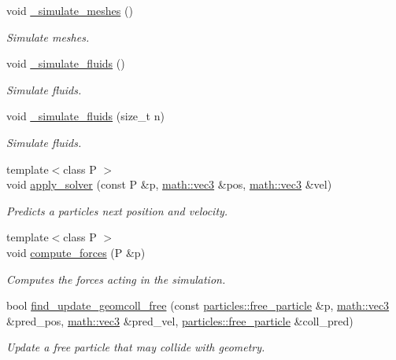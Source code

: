 \begin{DoxyCompactItemize}
void \hyperlink{classphysim_1_1simulator_ac598aa9b36e01c8cee937a8f95719cd8}{\+\_\+simulate\+\_\+meshes} ()
\begin{DoxyCompactList}\small\item\em Simulate meshes. \end{DoxyCompactList}\item 
void \hyperlink{classphysim_1_1simulator_ac01677745377a9520453b73e199fcf99}{\+\_\+simulate\+\_\+fluids} ()
\begin{DoxyCompactList}\small\item\em Simulate fluids. \end{DoxyCompactList}\item 
void \hyperlink{classphysim_1_1simulator_a5b0b7e9c7790144f17d5de13c8d098dc}{\+\_\+simulate\+\_\+fluids} (size\+\_\+t n)
\begin{DoxyCompactList}\small\item\em Simulate fluids. \end{DoxyCompactList}\item 
{\footnotesize template$<$class P $>$ }\\void \hyperlink{classphysim_1_1simulator_a551890b383f97f13bb429e40f72c6c33}{apply\+\_\+solver} (const P \&p, \hyperlink{structphysim_1_1math_1_1vec3}{math\+::vec3} \&pos, \hyperlink{structphysim_1_1math_1_1vec3}{math\+::vec3} \&vel)
\begin{DoxyCompactList}\small\item\em Predicts a particle\textquotesingle{}s next position and velocity. \end{DoxyCompactList}\item 
{\footnotesize template$<$class P $>$ }\\void \hyperlink{classphysim_1_1simulator_a00c7815358139bf08b2e13fe1ab377bc}{compute\+\_\+forces} (P \&p)
\begin{DoxyCompactList}\small\item\em Computes the forces acting in the simulation. \end{DoxyCompactList}\item 
bool \hyperlink{classphysim_1_1simulator_a223170686fbf961c62d52da3fdc964c8}{find\+\_\+update\+\_\+geomcoll\+\_\+free} (const \hyperlink{classphysim_1_1particles_1_1free__particle}{particles\+::free\+\_\+particle} \&p, \hyperlink{structphysim_1_1math_1_1vec3}{math\+::vec3} \&pred\+\_\+pos, \hyperlink{structphysim_1_1math_1_1vec3}{math\+::vec3} \&pred\+\_\+vel, \hyperlink{classphysim_1_1particles_1_1free__particle}{particles\+::free\+\_\+particle} \&coll\+\_\+pred)
\begin{DoxyCompactList}\small\item\em Update a free particle that may collide with geometry. \end{DoxyCompactList}\item 

\end{DoxyCompactItemize}
